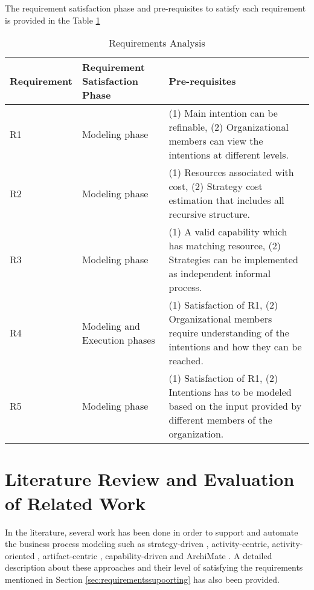  The requirement satisfaction phase and pre-requisites to satisfy each requirement is provided in the Table \ref{tab:subrequirements}

\begin{table} [htbp]
	\centering
	\begin{tabular} {p{2.5cm}p{3cm}p{8cm}}
		\toprule
		\textbf{Requirement} & \textbf{Requirement Satisfaction Phase} & \textbf{Pre-requisites}    \\
		\midrule                                                                                                               
		R1    & Modeling phase    &(1) Main intention can be refinable, (2) Organizational members can view the intentions at different levels.    \\ 
		
		R2   & Modeling phase    &(1) Resources associated with cost, (2) Strategy cost estimation that includes all recursive structure. \\         
			
		R3   & Modeling phase       &(1) A valid capability which has matching resource, (2) Strategies can be implemented as independent informal process. \\      
		
		R4   & Modeling and Execution phases     &(1) Satisfaction of R1, (2) Organizational members require understanding of the intentions and how they can be reached. \\                         
			
		R5  &Modeling phase  &(1) Satisfaction of R1, (2) Intentions has to be modeled based on the input provided by different members of the organization.               \\ 
		    
		\bottomrule
	\end{tabular}
	\caption{Requirements Analysis}
	\label{tab:subrequirements}
\end{table}

\section{Literature Review and Evaluation of Related Work}
\label{sec:literaturereview}
In the literature, several work has been done in order to support and automate the business process modeling such as strategy-driven \cite{Bider2005}, activity-centric\cite{Yarosh2009}, activity-oriented \cite{Leymann2000}, artifact-centric \cite{Cohn2009}, capability-driven \cite{Stirna2012} and ArchiMate \cite{Group2012}.  A detailed description about these approaches and their level of satisfying the requirements mentioned in Section \ref{sec:requirementssupoorting} has also been provided. 

